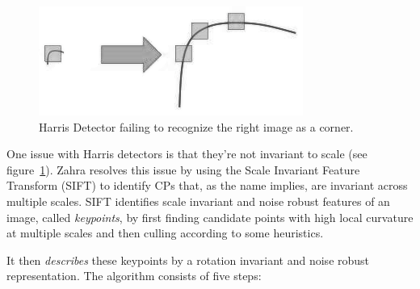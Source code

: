 \begin{figure}[!htbp]
	\centering
	\includegraphics[width=\linewidth,keepaspectratio]{figures/registration/sift/sift_scale_invariant.png}
	\caption{Harris Detector failing to recognize the right image as a corner.}
	\label{fig:sift_harris}
\end{figure}
One issue with Harris detectors is that they're not invariant to scale (see figure~\ref{fig:sift_harris}).
%
Zahra \etal \cite{zahrasift} resolves this issue by using the Scale Invariant Feature Transform \cite{lowe2004distinctive} (SIFT) to identify CPs that, as the name implies, are invariant across multiple scales.
%
SIFT identifies scale invariant and noise robust features of an image, called \textit{keypoints}, by first finding candidate points with high local curvature at multiple scales and then culling according to some heuristics.

%
It then \textit{describes} these keypoints by a rotation invariant and noise robust representation.
%
The algorithm consists of five steps:
%
